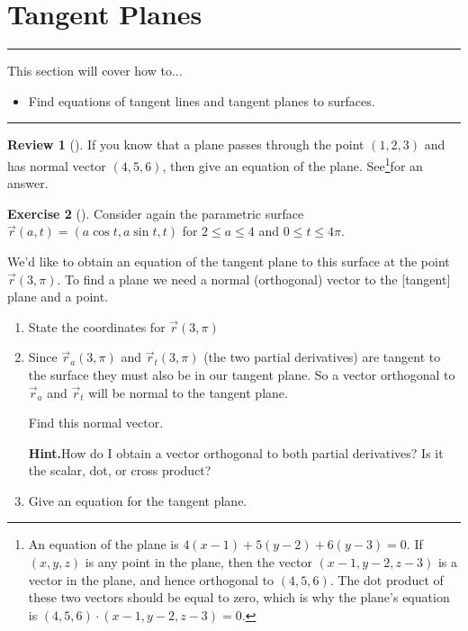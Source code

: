 \documentclass[10pt,]{book}
\theoremstyle{plain}
\theoremstyle{definition}
\theoremstyle{definition}
\theoremstyle{definition}
\newtheorem{project}{Review}[section]
\theoremstyle{definition}
\newtheorem{exploration}[project]{Exercise}
\newenvironment{objectives}[1]{\noindent\rule{\linewidth}{0.1ex}\newline{\textbf{{\large#1}}\par\smallskip}}{\par\noindent\rule{\linewidth}{0.1ex}\par\smallskip}
\theoremstyle{definition}
\numberwithin{equation}{section}
\begin{document}
\section[{Tangent Planes}]{Tangent Planes}\label{ch07_03_tangentplanes}
\begin{objectives}{Objectives}\label{objectives-14}
This section will cover how to...%
%
\begin{itemize}[label=\textbullet]
\item{}Find equations of tangent lines and tangent planes to surfaces.%
\end{itemize}
\end{objectives}
\begin{project}[]\label{project-1}
If you know that a plane passes through the point \((1,2,3)\) and has normal vector \((4,5,6)\), then give an equation of the plane. See\footnote{An equation of the plane is \(4(x-1)+5(y-2)+6(y-3)=0\). If \((x,y,z)\) is any point in the plane, then the vector \((x-1,y-2,z-3)\) is a vector in the plane, and hence orthogonal to \((4,5,6)\). The dot product of these two vectors should be equal to zero, which is why the plane's equation is \((4,5,6)\cdot (x-1,y-2,z-3)=0\).\label{fn-2}}for an answer.%
\end{project}
\begin{exploration}[]\label{exploration-142}
Consider again the parametric surface \(\vec r(a,t) = (a\cos t, a\sin t, t)\) for \(2\leq a\leq 4\) and \(0\leq t\leq 4\pi\).%
\par
We'd like to obtain an equation of the tangent plane to this surface at the point \(\vec r(3,\pi)\). To find a plane we need a normal (orthogonal) vector to the [tangent] plane and a point.%
\begin{enumerate}[font=\bfseries,label=(\alph*),ref=\alph*]
\item\label{task-307} State the coordinates for \(\vec r (3,\pi)\)%
\item\label{task-308} Since \(\vec r_a (3,\pi)\) and \(\vec r_t (3, \pi)\) (the two partial derivatives) are tangent to the surface they must also be in our tangent plane. So a vector orthogonal to \(\vec r_a\) and \(\vec r_t\) will be normal to the tangent plane.%
\par
Find this normal vector.%
\par\medskip\noindent%
\textbf{Hint.}\quad How do I obtain a vector orthogonal to both partial derivatives? Is it the scalar, dot, or cross product?%
\item\label{task-309} Give an equation for the tangent plane.%
\end{enumerate}
\end{exploration}
\end{document}
